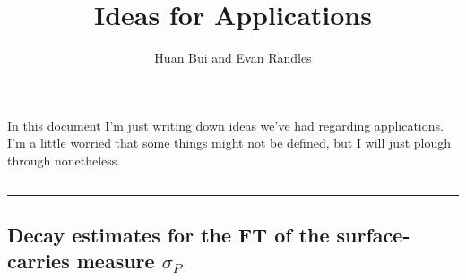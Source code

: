 \documentclass[11pt]{article}
\author{Huan Bui and Evan Randles}
\title{Ideas for Applications}
\date{}
\begin{document}
\maketitle


In this document I'm just writing down ideas we've had regarding applications. I'm a little worried that some things might not be defined, but I will just plough through nonetheless.

$\,$

\hrule

\subsection{Decay estimates for the FT of the surface-carries measure $\sigma_P$}
\end{document}
